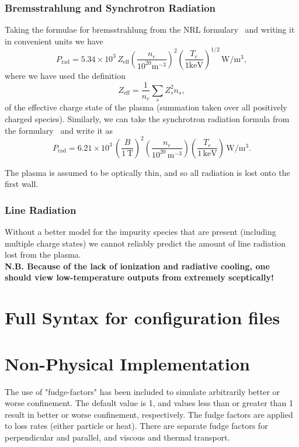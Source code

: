 \documentclass{revtex4-2}
\begin{document}
\subsubsection{Bremsstrahlung and Synchrotron Radiation}
Taking the formulae for bremsstrahlung from the NRL formulary~\cite{nrlformulary} and writing it in convenient units we have
\begin{equation}
P_{\mathrm{rad}} =  5.34 \times 10^3\, Z_{\mathrm{eff}} \left(\frac{n_e}{10^{20} \mathrm{m}^{-3}}\right)^2 \left(\frac{T_e}{1 \mathrm{keV}}\right)^{1/2}\, \mathrm{W}/\mathrm{m}^3,
\end{equation}
where we have used the definition
\begin{equation}
Z_{\mathrm{eff}} = \frac{1}{n_e} \sum_{s} Z_s^2 n_s,
\end{equation}
of the effective charge state of the plasma (summation taken over all positively charged species).
Similarly, we can take the synchrotron radiation formula from the formulary~\cite{nrlformulary} and write it as
\begin{equation}
P_{\mathrm{rad}} =  6.21 \times 10^3 \,\left( \frac{B}{1\,\mathrm{T}} \right)^2 \left( \frac{n_e}{10^{20}\, \mathrm{m}^{-3}} \right) \left( \frac{T_e}{1\,\mathrm{keV}} \right)\, \mathrm{W}/\mathrm{m}^3.
\end{equation}

The plasma is assumed to be optically thin, and so all radiation is lost onto the first wall.

\subsubsection{Line Radiation}
 Without a better model for the impurity species that are present (including multiple charge states) we cannot reliably predict the amount of line radiation lost from the plasma.
\\
\textbf{N.B. Because of the lack of ionization and radiative cooling, one should view low-temperature outputs from \mctrans{} extremely sceptically!}


\appendix
\section{Full Syntax for \mctrans{} configuration files}

\section{Non-Physical Implementation}
The use of "fudge-factors" has been included to simulate arbitrarily better or worse confinement. The default value is 1, and values less than or greater than 1 result in better or worse confinement, respectively. The fudge factors are applied to loss rates (either particle or heat). There are separate fudge factors for perpendicular and parallel, and viscous and thermal transport.




\end{document}
